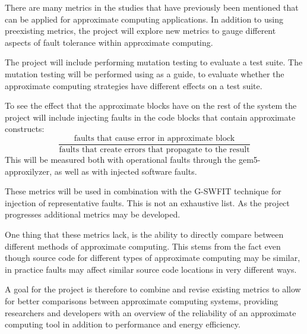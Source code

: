 There are many metrics in the studies that have previously been mentioned that can be applied for approximate computing applications. In addition to using preexisting metrics, the project will explore new metrics to gauge different aspects of fault tolerance within approximate computing.  

  The project will include performing mutation testing to evaluate a test suite. The mutation testing will be performed using \citet{papadakis2019mutation} as a guide, to evaluate whether the approximate computing strategies have different effects on a test suite.


To see the effect that the approximate blocks have on the rest of the system the project will include injecting faults in the code blocks that contain approximate constructs: 
$$\frac{\text{faults that cause error in approximate block}}{\text{faults that create errors that propagate to the result}}$$
This will be measured both with operational faults through the gem5-approxilyzer\citep{venkatagiri2019gem5}, as well as with injected software faults. 


These metrics will be used in combination with the G-SWFIT technique for injection of representative faults\citep{duraes2006emulation}.
This is not an exhaustive list. As the project progresses additional metrics may be developed.


One thing that these metrics lack, is the ability to directly compare between different methods of approximate computing. This stems from the fact even though source code for different types of approximate computing may be similar, in practice faults may affect similar source code locations in very different ways. 

A goal for the project is therefore to combine and revise existing metrics to allow for better comparisons between approximate computing systems, providing researchers and developers with an overview of the reliability of an approximate computing tool in addition to performance and energy efficiency.  
